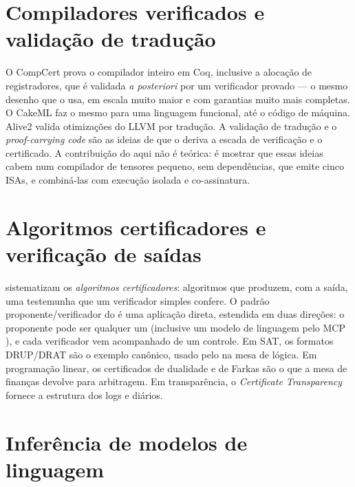 \section{Compiladores verificados e validação de tradução}

O CompCert \cite{leroy2009} prova o compilador inteiro em Coq, inclusive a alocação de registradores, que é validada \textit{a posteriori} por um verificador provado \cite{rideau2010} --- o mesmo desenho que o \vapor{} usa, em escala muito maior e com garantias muito mais completas. O CakeML \cite{kumar2014} faz o mesmo para uma linguagem funcional, até o código de máquina. Alive2 \cite{lopes2021} valida otimizações do LLVM por tradução. A validação de tradução \cite{pnueli1998} e o \textit{proof-carrying code} \cite{necula1997} são as ideias de que o \vapor{} deriva a escada de verificação e o certificado. A contribuição do \vapor{} aqui não é teórica: é mostrar que essas ideias cabem num compilador de tensores pequeno, sem dependências, que emite cinco ISAs, e combiná-las com execução isolada e co-assinatura.

\section{Algoritmos certificadores e verificação de saídas}

 sistematizam os \emph{algoritmos certificadores}: algoritmos que produzem, com a saída, uma testemunha que um verificador simples confere. O padrão proponente/verificador do \vapor{} é uma aplicação direta, estendida em duas direções: o proponente pode ser qualquer um (inclusive um modelo de linguagem pelo MCP \cite{mcp2024}), e cada verificador vem acompanhado de um controle. Em SAT, os formatos DRUP/DRAT \cite{goldberg2003,wetzler2014} são o exemplo canônico, usado pelo \vapor{} na mesa de lógica. Em programação linear, os certificados de dualidade e de Farkas \cite{schrijver1986} são o que a mesa de finanças devolve para arbitragem. Em transparência, o \textit{Certificate Transparency} \cite{rfc6962,rfc9162} fornece a estrutura dos logs e diários.

\section{Inferência de modelos de linguagem}

